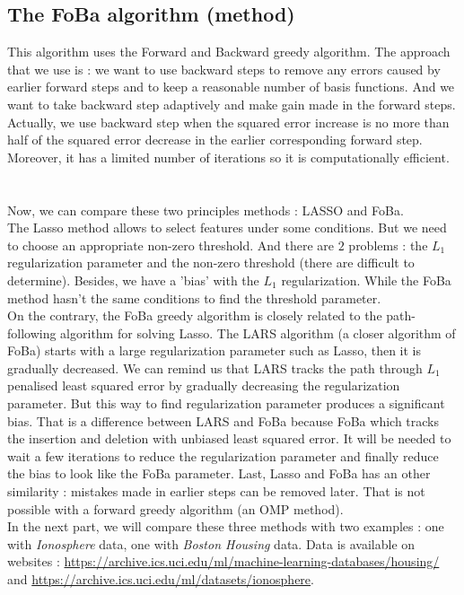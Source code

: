 \documentclass{article}
\begin{document}
\subsection{The FoBa algorithm (method)}
This algorithm uses the Forward and Backward greedy algorithm. The approach that we use is : we want to use backward steps to remove any errors caused by earlier forward steps and to keep a reasonable number of basis functions. And we want to take backward step adaptively and make gain made in the forward steps. Actually, we use backward step when the squared error increase is no more than half of the squared error decrease in the earlier corresponding forward step. Moreover, it has a limited number of iterations so it is computationally efficient. \\
\\
\\
Now, we can compare these two principles methods : LASSO and FoBa.\\
The Lasso method allows to select features under some conditions. But we need to choose an appropriate non-zero threshold. And there are $2$ problems : the $L_1$ regularization parameter and the non-zero threshold (there are difficult to determine). Besides, we have a 'bias' with the $L_1$ regularization. While the FoBa method hasn't the same conditions to find the threshold parameter.\\
On the contrary, the FoBa greedy algorithm is closely related to the path-following algorithm for solving Lasso. The LARS algorithm (a closer algorithm of FoBa) starts with a large regularization parameter such as Lasso, then it is gradually decreased. We can remind us that LARS tracks the path through $L_1$ penalised least squared error by gradually decreasing the regularization parameter. But this way to find regularization parameter produces a significant bias. That is a difference between LARS and FoBa because FoBa which tracks the insertion and deletion with unbiased least squared error. It will be needed to wait a few iterations to reduce the regularization parameter and finally reduce the bias to look like the FoBa parameter. Last, Lasso and FoBa has an other similarity : mistakes made in earlier steps can be removed later. That is not possible with a forward greedy algorithm (an OMP method).\\

In the next part, we will compare these three methods with two examples : one with \textit{Ionosphere} data, one with \textit{Boston Housing} data. Data is available on websites : \href{https://archive.ics.uci.edu/ml/machine-learning-databases/housing/}{https://archive.ics.uci.edu/ml/machine-learning-databases/housing/}\cite{house} and \href{https://archive.ics.uci.edu/ml/datasets/ionosphere}{https://archive.ics.uci.edu/ml/datasets/ionosphere}\cite{iono}. \\
\end{document}
